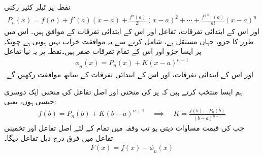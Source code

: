 نقطہ  پر ٹیلر کثیر رکنی
\begin{align*}
P_n(x)=f(a)+f'(a)(x-a)+\frac{f''(a)}{2!}(x-a)^2+\cdots+\frac{f^{(n)}(a)}{n!}(x-a)^n
\end{align*}
اور اس کے ابتدائی  تفرقات، تفاعل  اور اس کے ابتدائی  تفرقات کے موافق ہیں۔ اس میں  طرز کا جزو، جہاں  مستقل ہے، شامل کرنے سے یہ موافقت خراب نہیں ہوتی ہے چونکہ   پر ایسا جزو اور اس کے تمام تفرقات صفر ہیں۔نقطہ  پر یہ نیا تفاعل
\begin{align*}
\phi_n(x)=P_n(x)+K(x-a)^{n+1}
\end{align*}
اور اس کے ابتدائی  تفرقات،  اور اس کے ابتدائی  تفرقات کے ساتھ موافقت رکھیں گے۔

ہم ایسا   منتخب کرتے ہیں کہ  پر  کی منحنی اور اصل تفاعل  کی منحنی ایک دوسری جیسی ہوں، یعنی:
\begin{align}\label{مساوات_تسلسل_کے_کی_قیمت}
f(b)=P_n(b)+K(b-a)^{n+1}\quad \implies \quad K=\frac{f(b)-P_n(b)}{(b-a)^{n+1}}
\end{align}
جب  کی قیمت مساوات  دیتی ہو تب وقفہ  میں تمام  کے لئے اصل تفاعل  اور تخمینی تفاعل  میں فرق درج ذیل تفاعل دیگا۔
\begin{align*}
F(x)=f(x)-\phi_n(x)
\end{align*}

